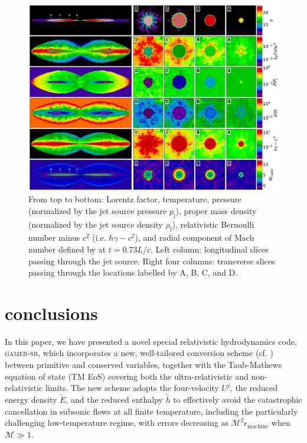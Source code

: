 \documentclass[twocolumn]{aastex63}
\begin{document}
\begin{figure}
	\includegraphics[width=\linewidth]{JetAccLowRes.png}
    \caption{
    From top to bottom: Lorentz factor, temperature, pressure (normalized by the jet source pressure $p_{\text{j}}$), proper mass density (normalized by the jet source density $\rho_{\text{j}}$), relativistic Bernoulli number minus $c^2$ (i.e. $h\gamma-c^2$), and radial component of Mach number defined by  at $t=0. 73 L/c$. Left column: longitudinal slices passing through the jet source. Right four columns: transverse slices passing through the locations labelled by A, B, C, and D.}
   \label{fig:Limb_brightened_jet}
\end{figure}


\section{conclusions}
\label{conclusions}
 In this paper, we have presented a novel special relativistic hydrodynamics code, \textsc{gamer-sr}, which incorporates a new, well-tailored conversion scheme (cf. ) between primitive and conserved variables, together with the Taub-Mathews equation of state (TM EoS) covering both the ultra-relativistic and non-relativistic limits. The new scheme adopts the four-velocity $U^{j}$, the reduced energy density $\tilde{E}$, and the reduced enthalpy $\tilde{h}$ to effectively avoid the catastrophic cancellation in subsonic flows at all finite temperature, including the particularly challenging low-temperature regime, with errors decreasing as $\mathscr{M}^2\epsilon_{\text{machine}}$ when $\mathscr{M}\gg1$.
\end{document}
